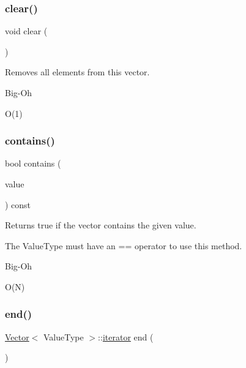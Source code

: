 \mbox{\label{classVector_ac8bb3912a3ce86b15842e79d0b421204}} 
\subsubsection{\texorpdfstring{clear()}{clear()}}
{\footnotesize\ttfamily void clear (\begin{DoxyParamCaption}{ }\end{DoxyParamCaption})}



Removes all elements from this vector. 

\begin{DoxyRefDesc}{Big-\/\+Oh}
\item[\mbox{\hyperlink{BigOh__BigOh000107}{Big-\/\+Oh}}]O(1) \end{DoxyRefDesc}
\mbox{\label{classVector_a6fbc1a150987e7e5320d244a3baeb560}} 
\subsubsection{\texorpdfstring{contains()}{contains()}}
{\footnotesize\ttfamily bool contains (\begin{DoxyParamCaption}\item[{const Value\+Type \&}]{value }\end{DoxyParamCaption}) const}



Returns true if the vector contains the given value. 

The Value\+Type must have an == operator to use this method. \begin{DoxyRefDesc}{Big-\/\+Oh}
\item[\mbox{\hyperlink{BigOh__BigOh000108}{Big-\/\+Oh}}]O(\+N) \end{DoxyRefDesc}
\mbox{\label{classVector_a2a45b7794f00a099c37860cf5df4477c}} 
\subsubsection{\texorpdfstring{end()}{end()}\hspace{0.1cm}{\footnotesize\ttfamily [1/2]}}
{\footnotesize\ttfamily \mbox{\hyperlink{classVector}{Vector}}$<$ Value\+Type $>$\+::\mbox{\hyperlink{classVector_aa8cbadd6807ea71ae7465ef4793a6866}{iterator}} end (\begin{DoxyParamCaption}{ }\end{DoxyParamCaption})}

